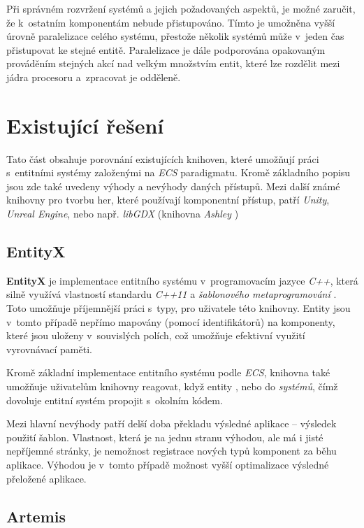 Při správném rozvržení systémů a jejich požadovaných aspektů, je možné zaručit, že k~ostatním komponentám nebude přistupováno. Tímto je umožněna vyšší úrovně paralelizace celého systému, přestože několik systémů může v~jeden čas přistupovat ke stejné entitě. Paralelizace je dále podporována opakovaným prováděním stejných akcí nad velkým množstvím entit, které lze rozdělit mezi jádra procesoru a~zpracovat je odděleně.

\section{Existující řešení}

Tato část obsahuje porovnání existujících knihoven, které umožňují práci s~entitními systémy založenými na \emph{ECS} paradigmatu. Kromě základního popisu jsou zde také uvedeny výhody a nevýhody daných přístupů. Mezi další známé knihovny pro tvorbu her, které používají komponentní přístup, patří \emph{Unity}, \emph{Unreal Engine}, nebo např. \emph{libGDX} (knihovna \emph{Ashley} \cite{Ashley})

\subsection{EntityX}

\textbf{EntityX} \cite{EntityX} je implementace entitního systému v~programovacím jazyce \emph{C++}, která silně využívá vlastností standardu \emph{C++11} a \emph{šablonového metaprogramování} \cite{CppMetaprogramming}. Toto umožňuje příjemnější práci s~typy, pro uživatele této knihovny. Entity jsou v~tomto případě nepřímo mapovány (pomocí identifikátorů) na komponenty, které jsou uloženy v~souvislých polích, což umožňuje efektivní využití vyrovnávací paměti. 

Kromě základní implementace entitního systému podle \emph{ECS}, knihovna také umožňuje uživatelům knihovny reagovat, když entity , nebo  do \emph{systémů}, čímž dovoluje entitní systém propojit s~okolním kódem.

Mezi hlavní nevýhody patří delší doba překladu výsledné aplikace -- výsledek použití šablon. Vlastnost, která je na jednu stranu výhodou, ale má i jisté nepříjemné stránky, je nemožnost registrace nových typů komponent za běhu aplikace. Výhodou je v~tomto případě možnost vyšší optimalizace výsledné přeložené aplikace.

\subsection{Artemis}

